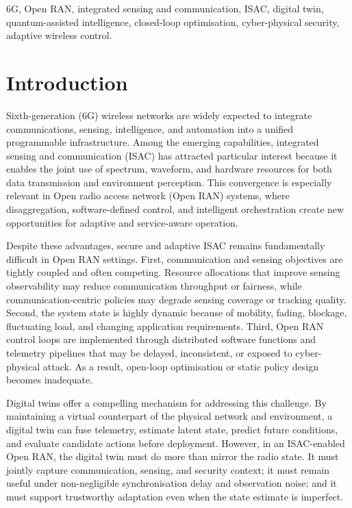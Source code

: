 \documentclass[10pt,journal]{IEEEtran}
\begin{document}
\begin{IEEEkeywords}
6G, Open RAN, integrated sensing and communication, ISAC, digital twin, quantum-assisted intelligence, closed-loop optimisation, cyber-physical security, adaptive wireless control.
\end{IEEEkeywords}

\section{Introduction}
Sixth-generation (6G) wireless networks are widely expected to integrate communications, sensing, intelligence, and automation into a unified programmable infrastructure. Among the emerging capabilities, integrated sensing and communication (ISAC) has attracted particular interest because it enables the joint use of spectrum, waveform, and hardware resources for both data transmission and environment perception. This convergence is especially relevant in Open radio access network (Open RAN) systems, where disaggregation, software-defined control, and intelligent orchestration create new opportunities for adaptive and service-aware operation.

Despite these advantages, secure and adaptive ISAC remains fundamentally difficult in Open RAN settings. First, communication and sensing objectives are tightly coupled and often competing. Resource allocations that improve sensing observability may reduce communication throughput or fairness, while communication-centric policies may degrade sensing coverage or tracking quality. Second, the system state is highly dynamic because of mobility, fading, blockage, fluctuating load, and changing application requirements. Third, Open RAN control loops are implemented through distributed software functions and telemetry pipelines that may be delayed, inconsistent, or exposed to cyber-physical attack. As a result, open-loop optimisation or static policy design becomes inadequate.

Digital twins offer a compelling mechanism for addressing this challenge. By maintaining a virtual counterpart of the physical network and environment, a digital twin can fuse telemetry, estimate latent state, predict future conditions, and evaluate candidate actions before deployment. However, in an ISAC-enabled Open RAN, the digital twin must do more than mirror the radio state. It must jointly capture communication, sensing, and security context; it must remain useful under non-negligible synchronisation delay and observation noise; and it must support trustworthy adaptation even when the state estimate is imperfect.
\end{document}
